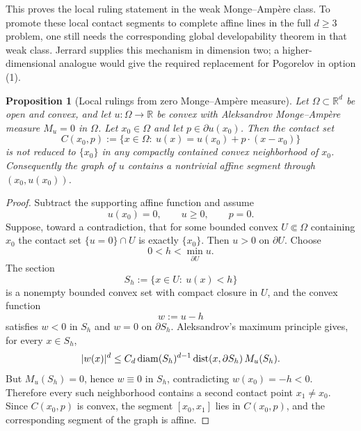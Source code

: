 \documentclass[11pt]{amsart}
\def\R{\mathbb{R}}
\newtheorem{proposition}[theorem]{Proposition}
\begin{document}
\begin{enumerate}
    This proves the local ruling statement in the weak Monge--Ampère class.  To
    promote these local contact segments to complete affine lines in the full
    $d\geq3$ problem, one still needs the corresponding global developability
    theorem in that weak class.  Jerrard supplies this mechanism in dimension
    two; a higher-dimensional analogue would give the required replacement for
    Pogorelov in option (1).
\end{enumerate}

\begin{proposition}[Local rulings from zero Monge--Ampère measure]
\label{prop:local-rulings-ma}
Let $\Omega\subset\R^d$ be open and convex, and let $u:\Omega\to\R$ be convex
with Aleksandrov Monge--Ampère measure $M_u=0$ in $\Omega$.  Let
$x_0\in\Omega$ and let $p\in\partial u(x_0)$.  Then the contact set
\[
    C(x_0,p):=
    \{x\in\Omega:\ u(x)=u(x_0)+p\cdot(x-x_0)\}
\]
is not reduced to $\{x_0\}$ in any compactly contained convex neighborhood of
$x_0$.  Consequently the graph of $u$ contains a nontrivial affine segment
through $(x_0,u(x_0))$.
\end{proposition}

\begin{proof}
Subtract the supporting affine function and assume
\[
    u(x_0)=0,\qquad u\geq0,\qquad p=0.
\]
Suppose, toward a contradiction, that for some bounded convex
$U\Subset\Omega$ containing $x_0$ the contact set $\{u=0\}\cap U$ is exactly
$\{x_0\}$.  Then $u>0$ on $\partial U$.  Choose
\[
    0<h<\min_{\partial U}u.
\]
The section
\[
    S_h:=\{x\in U:\ u(x)<h\}
\]
is a nonempty bounded convex set with compact closure in $U$, and the convex
function
\[
    w:=u-h
\]
satisfies $w<0$ in $S_h$ and $w=0$ on $\partial S_h$.  Aleksandrov's maximum
principle gives, for every $x\in S_h$,
\[
    |w(x)|^d
    \leq C_d\,{\rm diam}(S_h)^{d-1}\,
        {\rm dist}(x,\partial S_h)\,M_u(S_h).
\]
But $M_u(S_h)=0$, hence $w\equiv0$ in $S_h$, contradicting
$w(x_0)=-h<0$.  Therefore every such neighborhood contains a second contact
point $x_1\neq x_0$.  Since $C(x_0,p)$ is convex, the segment
$[x_0,x_1]$ lies in $C(x_0,p)$, and the corresponding segment of the graph is
affine.
\end{proof}
\end{document}
